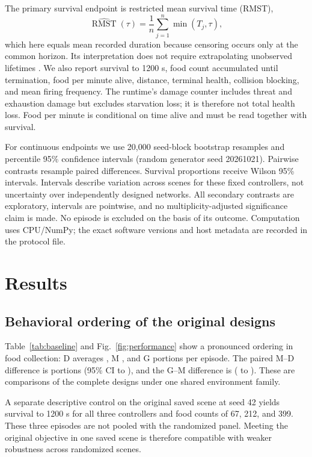 \documentclass[11pt]{article}
\begin{document}
The primary survival endpoint is restricted mean survival time (RMST),
\begin{equation}
\widehat{\operatorname{RMST}}(\tau)=\frac{1}{n}\sum_{j=1}^n\min(T_j,\tau),
\end{equation}
which here equals mean recorded duration because censoring occurs only at the common horizon. Its interpretation does not require extrapolating unobserved lifetimes \citep{royston2013}. We also report survival to 1200 s, food count accumulated until termination, food per minute alive, distance, terminal health, collision blocking, and mean firing frequency. The runtime's damage counter includes threat and exhaustion damage but excludes starvation loss; it is therefore not total health loss. Food per minute is conditional on time alive and must be read together with survival.

For continuous endpoints we use 20,000 seed-block bootstrap resamples and percentile 95\% confidence intervals (random generator seed 20261021). Pairwise contrasts resample paired differences. Survival proportions receive Wilson 95\% intervals. Intervals describe variation across scenes for these fixed controllers, not uncertainty over independently designed networks. All secondary contrasts are exploratory, intervals are pointwise, and no multiplicity-adjusted significance claim is made. No episode is excluded on the basis of its outcome. Computation uses CPU/NumPy; the exact software versions and host metadata are recorded in the protocol file.

\section{Results}
\subsection{Behavioral ordering of the original designs}
Table~\ref{tab:baseline} and Fig.~\ref{fig:performance} show a pronounced ordering in food collection: D averages \DFood{}, M \MFood{}, and G \GFood{} portions per episode. The paired M--D difference is \MDdiff{} portions (95\% CI \MDlo{} to \MDhi{}), and the G--M difference is \GMdiff{} (\GMlo{} to \GMhi{}). These are comparisons of the complete designs under one shared environment family.

A separate descriptive control on the original saved scene at seed 42 yields survival to 1200 s for all three controllers and food counts of 67, 212, and 399. These three episodes are not pooled with the randomized panel. Meeting the original objective in one saved scene is therefore compatible with weaker robustness across randomized scenes.
\end{document}
